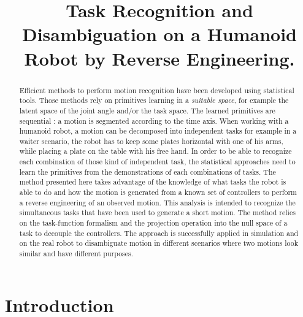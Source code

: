 \documentclass[letterpaper, 10pt, conference]{ieeeconf}      %
\title{\LARGE \bf
Task Recognition and Disambiguation on a Humanoid Robot by Reverse Engineering.
}
\begin{document}
\maketitle
\thispagestyle{empty}
\pagestyle{empty}


\begin{abstract}
Efficient methods to perform motion recognition have been developed
using statistical tools. Those methods rely on primitives learning
in a \emph{suitable space}, for example the latent space of the joint angle and/or the task space.
The learned primitives are sequential : a motion is segmented according to the time axis.
When working with a humanoid robot, a motion can be decomposed into
independent tasks for example in a waiter scenario,
the robot has to keep some plates horizontal with one of his arms, while placing a plate
on the table with his free hand.
In order to be able to recognize each combination of those kind of independent task,
the statistical approaches need to learn the primitives from the demonstrations of each
combinations of tasks.
The method presented here
takes advantage of the knowledge of what tasks the robot is able to do and how
the motion is generated from a known set of controllers to perform a reverse engineering of an
observed motion. This analysis is intended to recognize the simultaneous tasks that
have been used to generate a short motion. The method relies
on the task-function formalism and the projection operation into the null space of a task to decouple
the controllers.
The approach is successfully applied in simulation and on the real robot
to disambiguate motion in different scenarios where two motions look similar and have
different purposes.
\end{abstract}

\section{Introduction}
\end{document}
